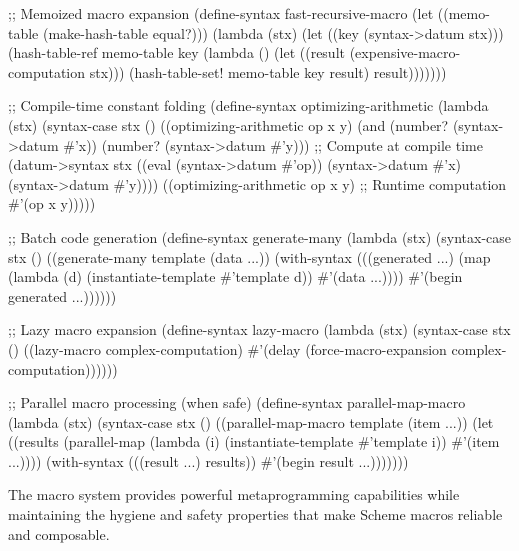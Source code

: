\begin{example}
\begin{lambdustcode}
;; Memoized macro expansion
(define-syntax fast-recursive-macro
  (let ((memo-table (make-hash-table equal?)))
    (lambda (stx)
      (let ((key (syntax->datum stx)))
        (hash-table-ref memo-table key
          (lambda ()
            (let ((result (expensive-macro-computation stx)))
              (hash-table-set! memo-table key result)
              result)))))))

;; Compile-time constant folding
(define-syntax optimizing-arithmetic
  (lambda (stx)
    (syntax-case stx ()
      ((optimizing-arithmetic op x y)
       (and (number? (syntax->datum #'x))
            (number? (syntax->datum #'y)))
       ;; Compute at compile time
       (datum->syntax stx 
         ((eval (syntax->datum #'op)) 
          (syntax->datum #'x) 
          (syntax->datum #'y))))
      ((optimizing-arithmetic op x y)
       ;; Runtime computation
       #'(op x y)))))

;; Batch code generation
(define-syntax generate-many
  (lambda (stx)
    (syntax-case stx ()
      ((generate-many template (data ...))
       (with-syntax (((generated ...)
                      (map (lambda (d) 
                             (instantiate-template #'template d))
                           #'(data ...))))
         #'(begin generated ...))))))

;; Lazy macro expansion
(define-syntax lazy-macro
  (lambda (stx)
    (syntax-case stx ()
      ((lazy-macro complex-computation)
       #'(delay (force-macro-expansion complex-computation))))))

;; Parallel macro processing (when safe)
(define-syntax parallel-map-macro
  (lambda (stx)
    (syntax-case stx ()
      ((parallel-map-macro template (item ...))
       (let ((results (parallel-map
                        (lambda (i) (instantiate-template #'template i))
                        #'(item ...))))
         (with-syntax (((result ...) results))
           #'(begin result ...)))))))
\end{lambdustcode}
\end{example}

The macro system provides powerful metaprogramming capabilities while maintaining the hygiene and safety properties that make Scheme macros reliable and composable.